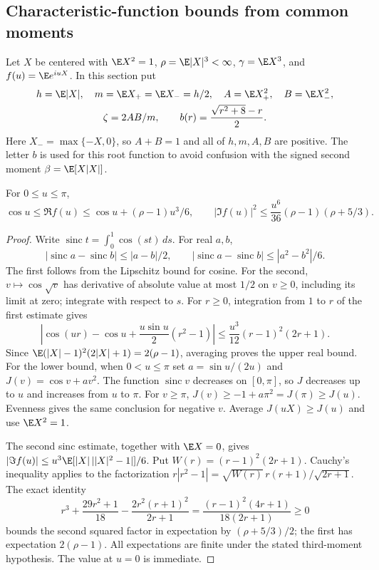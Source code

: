 \subsection{Characteristic-function bounds from common moments}
Let $X$ be centered with $\E X^2=1$, $\rho=\E|X|^3<\infty$,
$\gamma=\E X^3$, and $f(u)=\E e^{iuX}$. In this section put
\[
 \begin{gathered}
 h=\E|X|,\quad m=\E X_+=\E X_-=h/2,\quad
 A=\E X_+^2,\quad B=\E X_-^2,\\
 \zeta=2AB/m,\qquad b(r)=\frac{\sqrt{r^2+8}-r}{2}.
 \end{gathered}
\]
Here $X_-=\max\{-X,0\}$, so $A+B=1$ and all of $h,m,A,B$ are
positive. The letter $b$ is used for this root function to avoid confusion
with the signed second moment $\beta=\E[X|X|]$.

\begin{lemma}\label{j:fourier:anchor}
For $0\le u\le\pi$,
\[
 \cos u\le\Re f(u)\le\cos u+(\rho-1)u^3/6,
 \qquad
 |\Im f(u)|^2\le\frac{u^6}{36}(\rho-1)(\rho+5/3).
\]
\end{lemma}
\begin{proof}
Write $\operatorname{sinc}t=\int_0^1\cos(st)\,ds$. For real $a,b$,
\[
 |\operatorname{sinc}a-\operatorname{sinc}b|
 \le |a-b|/2,\qquad
 |\operatorname{sinc}a-\operatorname{sinc}b|
 \le |a^2-b^2|/6.
\]
The first follows from the Lipschitz bound for cosine. For the second,
$v\mapsto\cos\sqrt v$ has derivative of absolute value at most $1/2$
on $v\ge0$, including its limit at zero; integrate with respect to $s$.
For $r\ge0$, integration from $1$ to $r$ of the first estimate gives
\[
 \left|\cos(ur)-\cos u+\frac{u\sin u}{2}(r^2-1)\right|
 \le \frac{u^3}{12}(r-1)^2(2r+1).
\]
Since $\E(|X|-1)^2(2|X|+1)=2(\rho-1)$, averaging proves the
upper real bound. For the lower bound, when $0<u\le\pi$ set
$a=\sin u/(2u)$ and $J(v)=\cos v+av^2$. The function
$\operatorname{sinc}v$ decreases on $[0,\pi]$, so $J$ decreases up to
$u$ and increases from $u$ to $\pi$. For $v\ge\pi$,
$J(v)\ge-1+a\pi^2=J(\pi)\ge J(u)$. Evenness gives the same conclusion
for negative $v$. Average $J(uX)\ge J(u)$ and use $\E X^2=1$.

The second sinc estimate, together with $\E X=0$, gives
$|\Im f(u)|\le u^3\E[|X|\,||X|^2-1|]/6$.
Put $W(r)=(r-1)^2(2r+1)$. Cauchy's inequality applies to the factorization
$r|r^2-1|=\sqrt{W(r)}\,r(r+1)/\sqrt{2r+1}$.
The exact identity
\[
 r^3+\frac{29r^2+1}{18}
 -\frac{2r^2(r+1)^2}{2r+1}
 =\frac{(r-1)^2(4r+1)}{18(2r+1)}\ge0
\]
bounds the second squared factor in expectation by $(\rho+5/3)/2$;
the first has expectation $2(\rho-1)$. All expectations are finite under
the stated third-moment hypothesis. The value at $u=0$ is immediate.
\end{proof}

